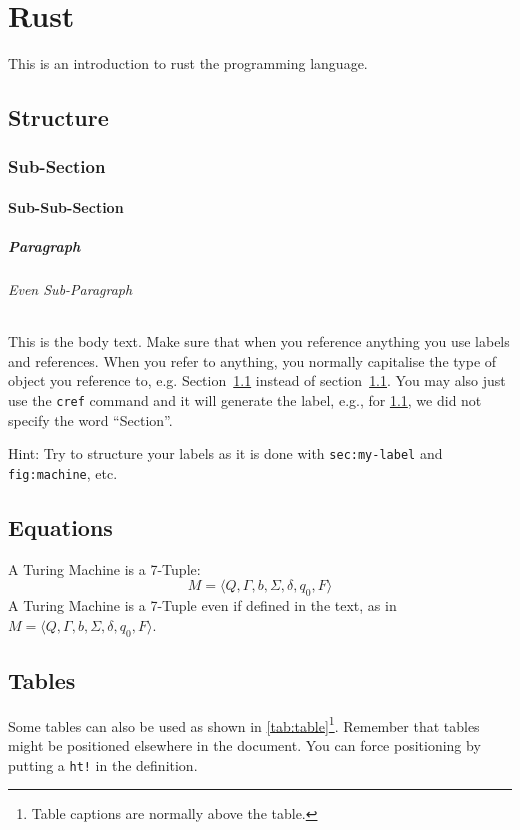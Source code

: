 \chapter{Rust}

This is an introduction to rust the programming language.

\section{Structure}
\label{sec:my-label}

\subsection{Sub-Section}

\subsubsection{Sub-Sub-Section}

\paragraph{Paragraph}

\subparagraph{Even Sub-Paragraph}

This is the body text. Make sure that when you reference anything you use labels and references. When you refer to anything, you normally capitalise the type of object you reference to, e.g. Section~\ref{sec:my-label} instead of section~\ref{sec:my-label}. You may also just use the \texttt{cref} command and it will generate the label, e.g., for \cref{sec:my-label}, we did not specify the word ``Section''.

Hint: Try to structure your labels as it is done with \texttt{sec:my-label} and \texttt{fig:machine}, etc.



\section{Equations}
A Turing Machine is a 7-Tuple:
\begin{equation}
	M = \langle Q, \Gamma, b, \Sigma, \delta, q_0, F \rangle
\end{equation}
A Turing Machine is a 7-Tuple even if defined in the text, as in $M = \langle Q, \Gamma, b, \Sigma, \delta, q_0, F \rangle$.




\section{Tables}
Some tables can also be used as shown in \cref{tab:table}\footnote{Table captions are normally above the table.}. Remember that tables might be positioned elsewhere in the document. You can force positioning by putting a \texttt{ht!} in the definition.

